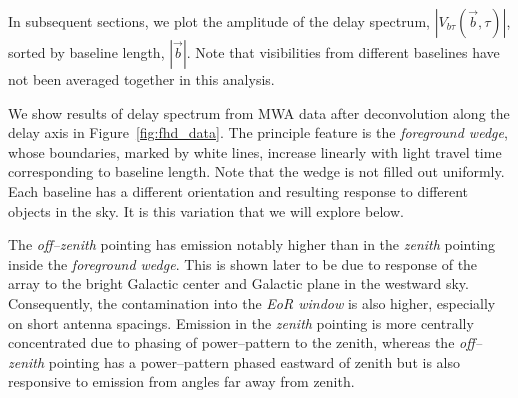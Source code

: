 \documentclass[preprint2,iop,numberedappendix]{emulateapj}
\begin{document}
In subsequent sections, we plot the amplitude of the delay spectrum, $|V_{b\tau}(\vec{b},\tau)|$, sorted by baseline length, $|\vec{b}|$. Note that visibilities from different baselines have not been averaged together in this analysis. 

We show results of delay spectrum from MWA data after deconvolution along the delay axis in Figure~\ref{fig:fhd_data}. The principle feature is the {\it foreground wedge}, whose boundaries, marked by white lines, increase linearly with light travel time corresponding to baseline length. Note that the wedge is not filled out uniformly. Each baseline has a different orientation and resulting response to different objects in the sky. It is this variation that we will explore below. 

The {\it off--zenith} pointing has emission notably higher than in the {\it zenith} pointing inside the {\it foreground wedge}. This is shown later to be due to response of the array to the bright Galactic center and Galactic plane in the westward sky. Consequently, the contamination into the {\it EoR window} is also higher, especially on short antenna spacings. Emission in the {\it zenith} pointing is more centrally concentrated due to phasing of power--pattern to the zenith, whereas the {\it off--zenith} pointing has a power--pattern phased eastward of zenith but is also responsive to emission from angles far away from zenith. 
\end{document}
